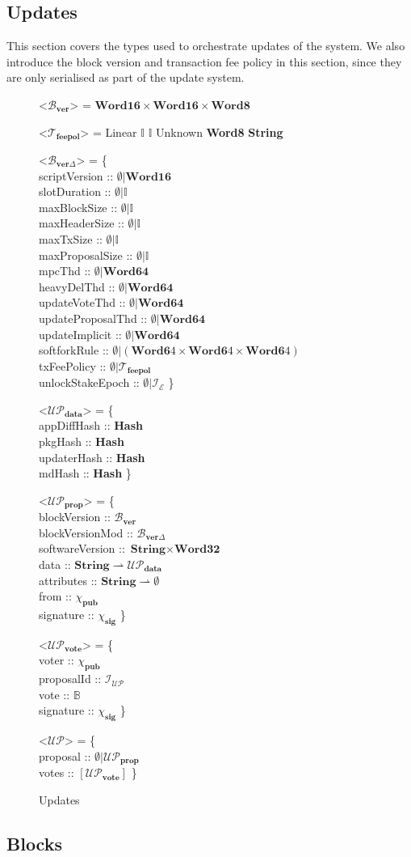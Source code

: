 \documentclass{article}
\def\fld{\\\llap{,\quad}}%
\newcommand{\rhu}{\rightharpoonup}
\newcommand{\lists}[1]{\left[{#1}\right]}
\newcommand{\maybe}[1]{\emptyset | {#1}}
\newcommand{\idsof}[1]{\mathcal{I}\!_#1}
\newcommand{\epochids}{\idsof{\mathcal{E}}}
\newcommand{\updids}{\idsof{\mathcal{UP}}}
\newcommand{\pubkey}{\chi_{\textbf{pub}}}
\newcommand{\signature}{\chi_{\textbf{sig}}}
\newcommand{\txs}{\mathcal{T}}
\newcommand{\txfeepol}{\txs_{\textbf{feepol}}}
\newcommand{\upd}{\mathcal{UP}}
\newcommand{\updprop}{\upd_{\textbf{prop}}}
\newcommand{\upddata}{\upd_{\textbf{data}}}
\newcommand{\updvote}{\upd_{\textbf{vote}}}
\newcommand{\blocks}{\mathcal{B}}
\newcommand{\blockver}{\blocks_{\textbf{ver}}}
\newcommand{\blockvermod}{\blocks_{\textbf{ver}\Delta}}
\newcommand{\hstype}[1]{\textbf{#1}}
\newcommand{\String}{\hstype{String}}
\newcommand{\Word}[1]{\hstype{Word#1}}
\newcommand{\hash}{\hstype{Hash}}
\newcommand{\Integer}{\mathbb{I}}
\newcommand{\Bool}{\mathbb{B}}
\begin{document}
\subsection{Updates}

This section covers the types used to orchestrate updates of the system. We also
introduce the block version and transaction fee policy in this section, since
they are only serialised as part of the update system.

\begin{figure}[H]
  \begin{grammar}
    <$\blockver$> = $\Word{16}\times\Word{16}\times\Word{8}$

    <$\txfeepol$> = Linear $\Integer$ $\Integer$
    \alt Unknown \Word{8} \String

    <$\blockvermod$> = \{
    \fld scriptVersion     :: $\maybe{\Word{16}}$
    \fld slotDuration      :: $\maybe{\Integer}$
    \fld maxBlockSize      :: $\maybe{\Integer}$
    \fld maxHeaderSize     :: $\maybe{\Integer}$
    \fld maxTxSize         :: $\maybe{\Integer}$
    \fld maxProposalSize   :: $\maybe{\Integer}$
    \fld mpcThd            :: $\maybe{\Word{64}}$
    \fld heavyDelThd       :: $\maybe{\Word{64}}$
    \fld updateVoteThd     :: $\maybe{\Word{64}}$
    \fld updateProposalThd :: $\maybe{\Word{64}}$
    \fld updateImplicit    :: $\maybe{\Word{64}}$
    \fld softforkRule      :: $\maybe{(\Word64\times\Word64\times\Word64)}$
    \fld txFeePolicy       :: $\maybe{\txfeepol}$
    \fld unlockStakeEpoch  :: $\maybe{\epochids}$
    \}

    <$\upddata$> = \{
    \fld appDiffHash :: \hash
    \fld pkgHash :: \hash
    \fld updaterHash :: \hash
    \fld mdHash :: \hash
    \}

    <$\updprop$> = \{
    \fld blockVersion :: $\blockver$
    \fld blockVersionMod :: $\blockvermod$
    \fld softwareVersion :: $\String \times \Word{32}$
    \fld data :: $\String \rhu \upddata$
    \fld attributes :: $\String \rhu \emptyset$
    \fld from :: $\pubkey$
    \fld signature :: $\signature$
    \}

    <$\updvote$> = \{
    \fld voter :: $\pubkey$
    \fld proposalId :: $\updids$
    \fld vote :: $\Bool$
    \fld signature :: $\signature$
    \}

    <$\upd$> = \{
    \fld proposal :: $\maybe{\updprop}$
    \fld votes :: $\lists{\updvote}$
    \}
  \end{grammar}
  \caption{Updates}
  \label{fig:updtypes}
\end{figure}
\subsection{Blocks}
\end{document}
